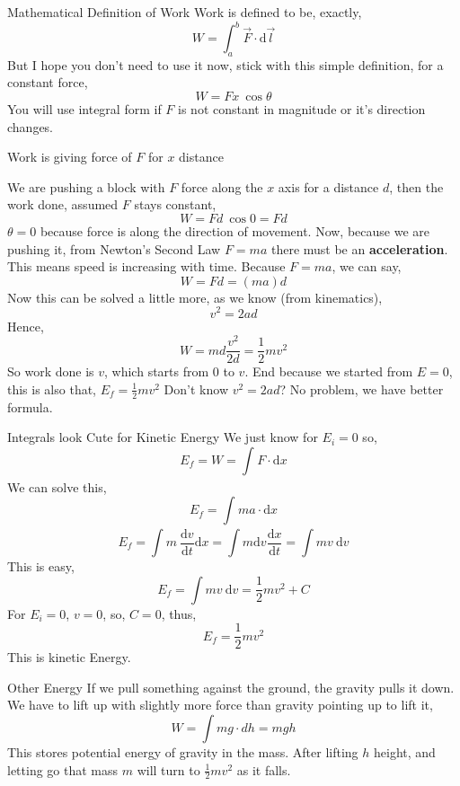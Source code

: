 \documentclass[9pt]{memoir}
\newcommand{\draw}[3]{ \begin{figure}[hbt!] \centering
 \fontsize{35pt}{20pt}\selectfont \resizebox{#1 \textwidth}{!}{
{#2.pdf_tex}}\caption{#3} \label{#3} \end{figure} }
\begin{document}
\begin{frame}
    {Mathematical Definition of Work}
    Work is defined to be, exactly, 
    \[ W = \int_{a}^{b} \vec F \cdot \mathrm d \vec l \]
    But I hope you don't need to use it now, stick with this simple definition, for a constant force, 
    \[ W = F x \ \cos \theta \]
    You will use integral form if $F$ is not constant in magnitude or it's direction changes.
\end{frame}





\begin{frame}
    {Work is giving force of $F$ for $x$ distance}
    \begin{small}    We are pushing a block with $F$ force along the $x$ axis for a distance $d$, then the work done, assumed $F$ stays constant, 
    \[ W = F d \ \cos 0 = F d \] 
    $\theta = 0$ because force is along the direction of movement. Now, because we are pushing it, from Newton's Second Law $F = ma$ there must be an \textbf{acceleration}. \\ 
This means speed is increasing with time. Because $F = ma$, we can say, 
\[ W = F d = \left( m a \right) d \]
Now this can be solved a little more, as we know (from kinematics), \[ v^2 = 2 a d \]
Hence, 
\[ W = md \frac{v^2}{2d} = \frac{1}{2} m v^2 \] 
So work done is $v$, which starts from $0$ to $v$. End because we started from $E=0$, this is also that, 
$E _f = \frac{1}{2} mv^2$
Don't know $v^2 = 2ad$? No problem, we have better formula. \end{small}
\end{frame}



\begin{frame}{Integrals look Cute for Kinetic Energy}
    We just know for $E_i =0$ so, 
    \[ E_f = W = \int_{}^{} F \cdot \mathrm d x   \]
    We can solve this, 
    \[ E_f = \int_{}^{}  m a \cdot \mathrm d x  \]
    \[ E_f = \int m \ \frac{\mathrm d v}{\mathrm d t} \mathrm d x = \int 
    m \mathrm d v \frac{\mathrm d x}{\mathrm d t} = \int m v  \ \mathrm d v\]
    This is easy, 
    \[ E_f = \int m v \ \mathrm d v = \frac{1}{2} mv^2 + C \]
    For $E_i = 0$, $v = 0$, so, $C = 0$, thus, 
    \[ E_f = \frac{1}{2 }m v^2 \]
    This is kinetic Energy.
\end{frame}

\begin{frame}
    {Other Energy} 
    {    If we pull something against the ground, the gravity pulls it down.
            We have to lift up with slightly more force than gravity pointing up to lift it, 
            \[ W= \int mg \cdot dh = mgh \]
            This stores potential energy of gravity in the mass. After lifting $h$ height, and letting go that mass $m$ will turn to $\frac{1}{2 }mv^2$ as it falls.
            }{ \draw{0.9}{work_grav}{}
    }  
\end{frame}
    
\end{document}
